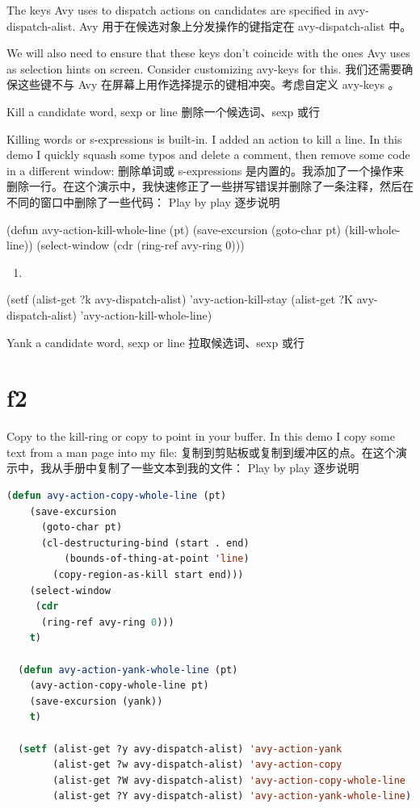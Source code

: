 \documentclass[lang=cn,color=blue]{elegantbook}
\begin{document}
The keys Avy uses to dispatch actions on candidates are specified in avy-dispatch-alist.
Avy 用于在候选对象上分发操作的键指定在 avy-dispatch-alist 中。

We will also need to ensure that these keys don’t coincide with the ones Avy uses as selection hints on screen. Consider customizing avy-keys for this.
我们还需要确保这些键不与 Avy 在屏幕上用作选择提示的键相冲突。考虑自定义 avy-keys 。

Kill a candidate word, sexp or line
删除一个候选词、sexp 或行

Killing words or s-expressions is built-in. I added an action to kill a line. In this demo I quickly squash some typos and delete a comment, then remove some code in a different window:
删除单词或 s-expressions 是内置的。我添加了一个操作来删除一行。在这个演示中，我快速修正了一些拼写错误并删除了一条注释，然后在不同的窗口中删除了一些代码：
Play by play  逐步说明

(defun avy-action-kill-whole-line (pt)
  (save-excursion
    (goto-char pt)
    (kill-whole-line))
  (select-window
   (cdr
    (ring-ref avy-ring 0)))
\begin{enumerate}
\item 
\end{enumerate}

(setf (alist-get ?k avy-dispatch-alist) 'avy-action-kill-stay
      (alist-get ?K avy-dispatch-alist) 'avy-action-kill-whole-line)

Yank a candidate word, sexp or line
拉取候选词、sexp 或行
\section{f2}
\label{sec:orgd090bc4}
Copy to the kill-ring or copy to point in your buffer. In this demo I copy some text from a man page into my file:
复制到剪贴板或复制到缓冲区的点。在这个演示中，我从手册中复制了一些文本到我的文件：
Play by play  逐步说明
\begin{lstlisting}[language=Lisp,numbers=none]
  (defun avy-action-copy-whole-line (pt)
    (save-excursion
      (goto-char pt)
      (cl-destructuring-bind (start . end)
          (bounds-of-thing-at-point 'line)
        (copy-region-as-kill start end)))
    (select-window
     (cdr
      (ring-ref avy-ring 0)))
    t)

  (defun avy-action-yank-whole-line (pt)
    (avy-action-copy-whole-line pt)
    (save-excursion (yank))
    t)

  (setf (alist-get ?y avy-dispatch-alist) 'avy-action-yank
        (alist-get ?w avy-dispatch-alist) 'avy-action-copy
        (alist-get ?W avy-dispatch-alist) 'avy-action-copy-whole-line
        (alist-get ?Y avy-dispatch-alist) 'avy-action-yank-whole-line)
\end{lstlisting}
\end{document}
